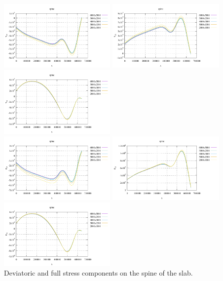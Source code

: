 \begin{center}
\includegraphics[width=5.7cm]{python_codes/fieldstone_55/gamma100/tau_xx_spine}
\includegraphics[width=5.7cm]{python_codes/fieldstone_55/gamma100/tau_yy_spine}
\includegraphics[width=5.7cm]{python_codes/fieldstone_55/gamma100/tau_xy_spine}\\
\includegraphics[width=5.7cm]{python_codes/fieldstone_55/gamma100/sigma_xx_spine}
\includegraphics[width=5.7cm]{python_codes/fieldstone_55/gamma100/sigma_yy_spine}
\includegraphics[width=5.7cm]{python_codes/fieldstone_55/gamma100/sigma_xy_spine}\\
{\captionfont Deviatoric and full stress components on the spine of the slab.}
\end{center}

